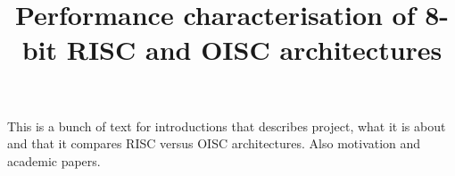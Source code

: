 \documentclass[portrait,color=UCLmidgreen,margin=1.5cm,bannerheight=8cm,logoheight=2.5cm]{uclposter}
\title{Performance characterisation of 8-bit RISC and OISC architectures}
\begin{document}

\maketitle
{}
\begin{tcolorbox}[title=Introduction]
	
This is a bunch of text for introductions that describes project, what it is about and that it compares RISC versus OISC architectures. Also motivation and academic papers.
\end{tcolorbox}
\end{document}
